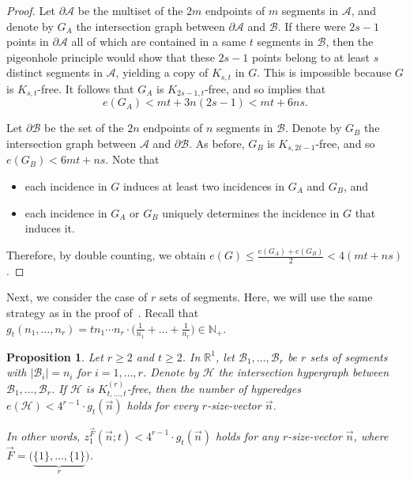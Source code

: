 \documentclass[11pt]{article}
\newtheorem{proposition}[theorem]{Proposition}
\theoremstyle{definition}
\newcommand*{\N}{\mathbb{N}}                                    %
\newcommand*{\R}{\mathbb{R}}                                    %
\newcommand*{\cH}{\mathcal{H}}
\newcommand*{\vF}{\vec{F}}
\newcommand*{\cB}{\mathcal{B}}
\newcommand*{\cA}{\mathcal{A}}
\newcommand*{\vn}{\vec{n}}
\begin{document}
\begin{proof}
    Let $\partial \cA$ be the multiset of the $2m$ endpoints of $m$ segments in $\cA$, and denote by $G_A$ the intersection graph between $\partial \cA$ and $\cB$. If there were $2s - 1$ points in $\partial \cA$ all of which are contained in a same $t$ segments in $\cB$, then the pigeonhole principle would show that these $2s - 1$ points belong to at least $s$ distinct segments in $\cA$, yielding a copy of $K_{s, t}$ in $G$. This is impossible because $G$ is $K_{s, t}$-free. It follows that $G_A$ is $K_{2s-1, t}$-free, and so  implies that 
    \[
    e(G_A) <  m  t + 3n (2s-1)  < mt + 6ns. 
    \]

    Let $\partial \cB$ be the set of the $2n$ endpoints of $n$ segments in $\cB$. Denote by $G_B$ the intersection graph between $\cA$ and $\partial \cB$. As before, $G_B$ is $K_{s, 2t-1}$-free, and so $e(G_B) < 6mt + ns$. Note that
    \vspace{-0.5em}
    \begin{itemize}
        \item each incidence in $G$ induces at least two incidences in $G_A$ and $G_B$, and
        \vspace{-0.5em}
        \item each incidence in $G_A$ or $G_B$ uniquely determines the incidence in $G$ that induces it. 
    \end{itemize}
    \vspace{-0.5em}
    Therefore, by double counting, we obtain $e(G) \le \frac{e(G_A) + e(G_B)}{2} < 4(mt + ns)$. 
\end{proof}

Next, we consider the case of $r$ sets of segments. Here, we will use the same strategy as in the proof of~\cite[Proposition 8]{chan_keller_smorodinsky}. Recall that $g_t(n_1, \dots, n_r) = t n_1 \cdots n_r \cdot \bigl( \frac{1}{n_1} + \dots + \frac{1}{n_r} \bigr) \in \N_+$. 

\begin{proposition} \label{prop:r_segment}
    Let $r \ge 2$ and $t \ge 2$. In $\R^1$, let $\cB_1, \dots, \cB_r$ be $r$ sets of segments with $|\cB_i| = n_i$ for $i = 1, \dots, r$. Denote by $\cH$ the intersection hypergraph between $\cB_1, \dots, \cB_r$. If $\cH$ is $K_{t, \dots, t}^{(r)}$-free, then the number of hyperedges $e(\cH) < 4^{r-1} \cdot g_t(\vn)$ holds for every $r$-size-vector $\vn$. 
    
    In other words, $z_1^{\vF}(\vn; t) < 4^{r-1} \cdot g_t(\vn)$ holds for any $r$-size-vector $\vn$, where $\vF = \bigl( \underbrace{\{1\}, \dots, \{1\}}_{r} \bigr)$. 
\end{proposition}
  
\end{document}
